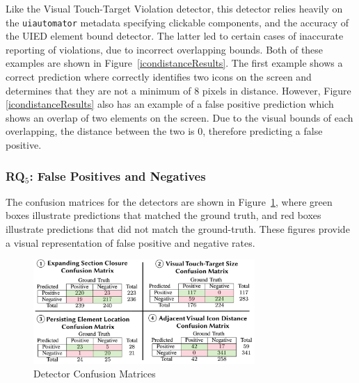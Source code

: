Like the Visual Touch-Target Violation detector, this detector relies heavily on the \texttt{\small uiautomator} metadata specifying clickable components, and the accuracy of the UIED element bound detector. The latter led to certain cases of inaccurate reporting of violations, due to incorrect overlapping bounds. Both of these examples are shown in Figure~\ref{icondistanceResults}. The first example shows a correct prediction where \MotorEase correctly identifies two icons on the screen and determines that they are not a minimum of 8 pixels in distance. However, Figure \ref{icondistanceResults} also has an example of a false positive prediction which shows an overlap of two elements on the screen. Due to the visual bounds of each overlapping, the distance between the two is 0, therefore predicting a false positive. 



\subsubsection{RQ$_5$: False Positives and Negatives}
The confusion matrices for the detectors are shown in Figure~\ref{matrices}, where green boxes illustrate predictions that matched the ground truth, and red boxes illustrate predictions that did not match the ground-truth. These figures provide 
	a visual representation of false positive and negative rates. 
	
	\begin{figure}[h]
    \centering
    \includegraphics[width=0.75\textwidth]{imgs/confusion-matrices.pdf}
    \caption{Detector Confusion Matrices}
    \label{matrices}
\end{figure}


